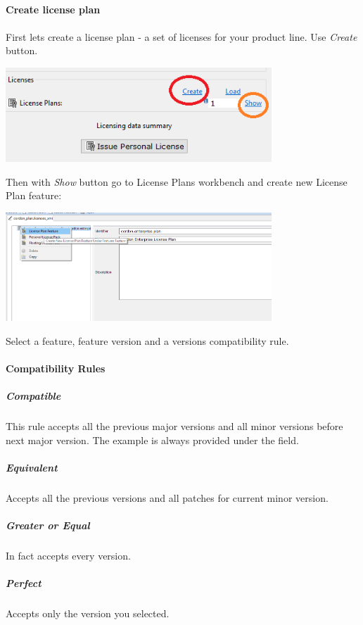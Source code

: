 \documentclass[12pt]{report}
\begin{document}
\paragraph*{Create license plan}
\paragraph*{}

First lets create a license plan - a set of licenses for your product line. Use \textit{Create} button.

\begin{center}
    \includegraphics[width=0.75\textwidth]{license_create}
\end{center}

Then with \textit{Show} button go to License Plans workbench and create new License Plan feature:

\begin{center}
    \includegraphics[width=0.75\textwidth]{license_plan_create}
\end{center}

Select a feature, feature version and a versions compatibility rule.

\paragraph*{Compatibility Rules}

\subparagraph*{Compatible}
This rule accepts all the previous major versions and all minor versions before next major version. The example is always provided under the field.
\subparagraph*{Equivalent}
Accepts all the previous versions and all patches for current minor version.
\subparagraph*{Greater or Equal}
In fact accepts every version.
\subparagraph*{Perfect}
Accepts only the version you selected.
\end{document}
